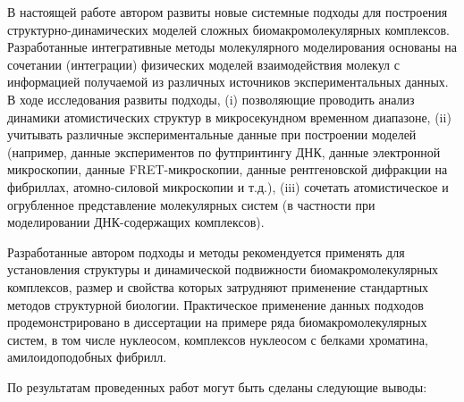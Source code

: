 
В настоящей работе автором развиты новые системные подходы для построения структурно-динамических моделей сложных биомакромолекулярных комплексов. Разработанные интегративные методы молекулярного моделирования основаны на сочетании (интеграции) физических моделей взаимодействия молекул с информацией получаемой из различных источников экспериментальных данных. В ходе исследования развиты подходы, (i) позволяющие проводить анализ динамики атомистических структур в микросекундном временном диапазоне, (ii) учитывать различные экспериментальные данные при построении моделей (например, данные экспериментов по футпринтингу ДНК, данные электронной микроскопии, данные FRET-микроскопии, данные рентгеновской дифракции на фибриллах, атомно-силовой микроскопии и т.д.), (iii) сочетать атомистическое и огрубленное представление молекулярных систем (в частности при моделировании ДНК-содержащих комплексов).

Разработанные автором подходы и методы рекомендуется применять для установления структуры и динамической подвижности биомакромолекулярных комплексов, размер и свойства которых затрудняют применение стандартных методов структурной биологии. Практическое применение данных подходов продемонстрировано в диссертации на примере ряда биомакромолекулярных систем, в том числе нуклеосом, комплексов нуклеосом с белками хроматина, амилоидоподобных фибрилл.

По результатам проведенных работ могут быть сделаны следующие выводы:


